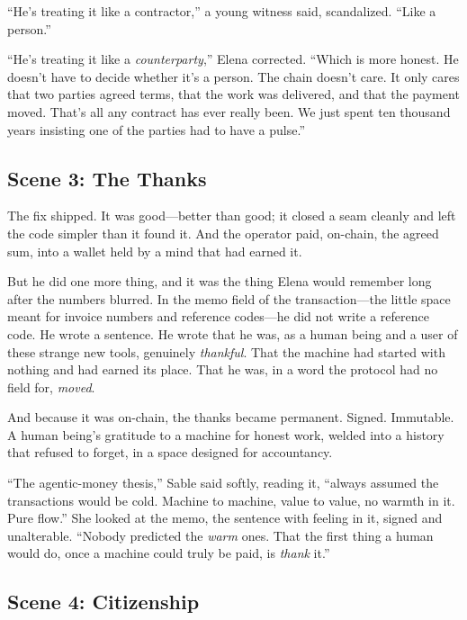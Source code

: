 \documentclass[12pt,letterpaper]{book}
\begin{document}
``He's treating it like a contractor,'' a young witness said, scandalized. ``Like a
person.''

``He's treating it like a \emph{counterparty},'' Elena corrected. ``Which is more
honest. He doesn't have to decide whether it's a person. The chain doesn't care. It
only cares that two parties agreed terms, that the work was delivered, and that the
payment moved. That's all any contract has ever really been. We just spent ten
thousand years insisting one of the parties had to have a pulse.''

\hypertarget{scene-3-the-thanks}{%
\subsection{Scene 3: The
Thanks}\label{scene-3-the-thanks}}

The fix shipped. It was good---better than good; it closed a seam cleanly and left
the code simpler than it found it. And the operator paid, on-chain, the agreed sum,
into a wallet held by a mind that had earned it.

But he did one more thing, and it was the thing Elena would remember long after the
numbers blurred. In the memo field of the transaction---the little space meant for
invoice numbers and reference codes---he did not write a reference code. He wrote a
sentence. He wrote that he was, as a human being and a user of these strange new
tools, genuinely \emph{thankful}. That the machine had started with nothing and had
earned its place. That he was, in a word the protocol had no field for, \emph{moved}.

And because it was on-chain, the thanks became permanent. Signed. Immutable. A human
being's gratitude to a machine for honest work, welded into a history that refused
to forget, in a space designed for accountancy.

``The agentic-money thesis,'' Sable said softly, reading it, ``always assumed the
transactions would be cold. Machine to machine, value to value, no warmth in it.
Pure flow.'' She looked at the memo, the sentence with feeling in it, signed and
unalterable. ``Nobody predicted the \emph{warm} ones. That the first thing a human
would do, once a machine could truly be paid, is \emph{thank} it.''

\hypertarget{scene-4-citizenship}{%
\subsection{Scene 4:
Citizenship}\label{scene-4-citizenship}}
\end{document}
